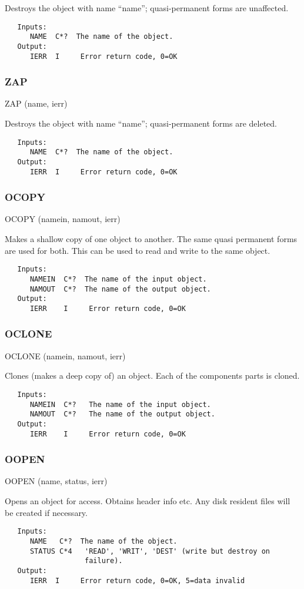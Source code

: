    Destroys the object with name ``name''; quasi-permanent forms are
unaffected.
{\small\begin{verbatim}
   Inputs:
      NAME  C*?  The name of the object.
   Output:
      IERR  I     Error return code, 0=OK
\end{verbatim}}
\subsubsection{ZAP}
    ZAP (name, ierr)

   Destroys the object with name ``name''; quasi-permanent forms are
deleted.
{\small\begin{verbatim}
   Inputs:
      NAME  C*?  The name of the object.
   Output:
      IERR  I     Error return code, 0=OK
\end{verbatim}}
\subsubsection{OCOPY}
    OCOPY (namein, namout, ierr)

   Makes a shallow copy of one object to another.  The same quasi
permanent forms are used for both.  This can be used to read and write
to the same object.
{\small\begin{verbatim}
   Inputs:
      NAMEIN  C*?  The name of the input object.
      NAMOUT  C*?  The name of the output object.
   Output:
      IERR    I     Error return code, 0=OK
\end{verbatim}}
\subsubsection{OCLONE}
   OCLONE (namein, namout, ierr)

   Clones (makes a deep copy of) an  object.  Each of the
components parts is cloned.
{\small\begin{verbatim}
   Inputs:
      NAMEIN  C*?   The name of the input object.
      NAMOUT  C*?   The name of the output object.
   Output:
      IERR    I     Error return code, 0=OK
\end{verbatim}}
\subsubsection{OOPEN}
   OOPEN (name, status, ierr)

   Opens an object for access.  Obtains header info etc.  Any disk
resident files will be created if necessary.
{\small\begin{verbatim}
   Inputs:
      NAME   C*?  The name of the object.
      STATUS C*4   'READ', 'WRIT', 'DEST' (write but destroy on
                   failure).
   Output:
      IERR  I     Error return code, 0=OK, 5=data invalid
\end{verbatim}}
